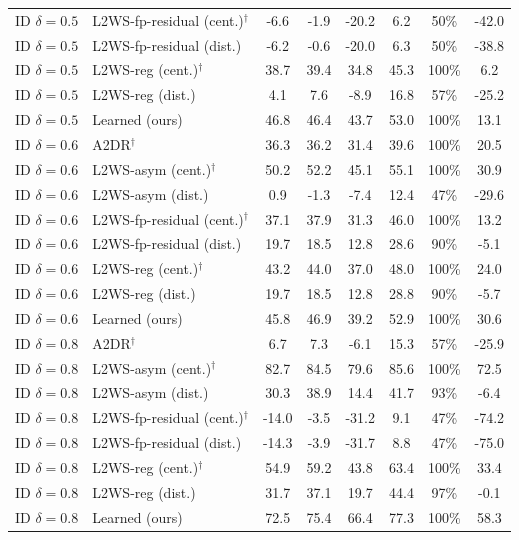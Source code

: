 \begin{tabular}{llcccccc}
ID $\delta=0.5$ & L2WS-fp-residual (cent.)$^\dagger$ & -6.6 & -1.9 & -20.2 & 6.2 & 50\% & -42.0 \\
ID $\delta=0.5$ & L2WS-fp-residual (dist.) & -6.2 & -0.6 & -20.0 & 6.3 & 50\% & -38.8 \\
ID $\delta=0.5$ & L2WS-reg (cent.)$^\dagger$ & 38.7 & 39.4 & 34.8 & 45.3 & 100\% & 6.2 \\
ID $\delta=0.5$ & L2WS-reg (dist.) & 4.1 & 7.6 & -8.9 & 16.8 & 57\% & -25.2 \\
ID $\delta=0.5$ & Learned (ours) & 46.8 & 46.4 & 43.7 & 53.0 & 100\% & 13.1 \\
ID $\delta=0.6$ & A2DR$^\dagger$ & 36.3 & 36.2 & 31.4 & 39.6 & 100\% & 20.5 \\
ID $\delta=0.6$ & L2WS-asym (cent.)$^\dagger$ & 50.2 & 52.2 & 45.1 & 55.1 & 100\% & 30.9 \\
ID $\delta=0.6$ & L2WS-asym (dist.) & 0.9 & -1.3 & -7.4 & 12.4 & 47\% & -29.6 \\
ID $\delta=0.6$ & L2WS-fp-residual (cent.)$^\dagger$ & 37.1 & 37.9 & 31.3 & 46.0 & 100\% & 13.2 \\
ID $\delta=0.6$ & L2WS-fp-residual (dist.) & 19.7 & 18.5 & 12.8 & 28.6 & 90\% & -5.1 \\
ID $\delta=0.6$ & L2WS-reg (cent.)$^\dagger$ & 43.2 & 44.0 & 37.0 & 48.0 & 100\% & 24.0 \\
ID $\delta=0.6$ & L2WS-reg (dist.) & 19.7 & 18.5 & 12.8 & 28.8 & 90\% & -5.7 \\
ID $\delta=0.6$ & Learned (ours) & 45.8 & 46.9 & 39.2 & 52.9 & 100\% & 30.6 \\
ID $\delta=0.8$ & A2DR$^\dagger$ & 6.7 & 7.3 & -6.1 & 15.3 & 57\% & -25.9 \\
ID $\delta=0.8$ & L2WS-asym (cent.)$^\dagger$ & 82.7 & 84.5 & 79.6 & 85.6 & 100\% & 72.5 \\
ID $\delta=0.8$ & L2WS-asym (dist.) & 30.3 & 38.9 & 14.4 & 41.7 & 93\% & -6.4 \\
ID $\delta=0.8$ & L2WS-fp-residual (cent.)$^\dagger$ & -14.0 & -3.5 & -31.2 & 9.1 & 47\% & -74.2 \\
ID $\delta=0.8$ & L2WS-fp-residual (dist.) & -14.3 & -3.9 & -31.7 & 8.8 & 47\% & -75.0 \\
ID $\delta=0.8$ & L2WS-reg (cent.)$^\dagger$ & 54.9 & 59.2 & 43.8 & 63.4 & 100\% & 33.4 \\
ID $\delta=0.8$ & L2WS-reg (dist.) & 31.7 & 37.1 & 19.7 & 44.4 & 97\% & -0.1 \\
ID $\delta=0.8$ & Learned (ours) & 72.5 & 75.4 & 66.4 & 77.3 & 100\% & 58.3 \\

\end{tabular}
